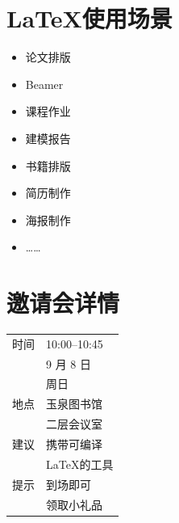 \documentclass[a0paper,fleqn]{betterposter}
\begin{document}
{%

\section{\LaTeX 使用场景}
\begin{multicols}{2}
\begin{itemize}
\item %
论文排版%
\item Beamer %
\item 课程作业
\item 建模报告
\item 书籍排版
\item 简历制作
\item 海报制作
\item ……
\end{itemize}
\end{multicols}

\section{邀请会详情}

\begin{tabular}{l@{\quad}p{}}
时间 & 10:00--10:45\\ & 9 月 8 日 \\ & 周日 \\[1ex]
地点 & 玉泉图书馆\\ & 二层会议室 \\[1ex]
建议 & 携带可编译\\ & \LaTeX 的工具 \\[1ex]
提示 & 到场即可\\ & 领取小礼品 \\[5ex] 


\end{tabular}}
\end{document}

